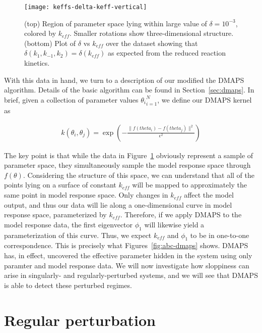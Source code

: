 \begin{figure}[ht!]
  \centering
  \texttt{[image: keffs-delta-keff-vertical]}
  \caption[Quantitative three-dimensional views of level sets of the
  effective parameter in a model of chemical kinetics]{(top) Region of
    parameter space lying within large value of $\delta = 10^{-3}$,
    colored by $k_{eff}$. Smaller rotations show three-dimensional
    structure. (bottom) Plot of $\delta$ vs $k_{eff}$ over the dataset
    showing that $\delta(k_1, k_{-1}, k_2) = \delta(k_{eff})$ as
    expected from the reduced reaction kinetics. \label{fig:abc-keff}
  }
\end{figure}

With this data in hand, we turn to a description of our modified the
DMAPS algorithm. Details of the basic algorithm can be found in
Section~\ref{sec:dmaps}. In brief, given a collection of parameter
values ${\theta_i}_{i=1}^N$, we define our DMAPS kernel as

\begin{align}
  k(\theta_i, \theta_j) = \exp \left(-\frac{\|f(theta_i) -
  f(theta_j)\|^2}{\epsilon^2} \right)
\end{align}

The key point is that while the data in Figure~\ref{fig:abc-keff}
obviously represent a sample of parameter space, they simultaneously
sample the model response space through $f(\theta)$. Considering the
structure of this space, we can understand that all of the points
lying on a surface of constant $k_{eff}$ will be mapped to
approximately the same point in model response space. Only changes in
$k_{eff}$ affect the model output, and thus our data will lie along a
one-dimensional curve in model response space, parameterized by
$k_{eff}$. Therefore, if we apply DMAPS to the model response data,
the first eigenvector $\phi_1$ will likewise yield a parameterization
of this curve. Thus, we expect $k_{eff}$ and $\phi_1$ to be in
one-to-one correspondence. This is precisely what
Figures~\ref{fig:abc-dmaps} shows. DMAPS has, in effect, uncovered the
effective parameter hidden in the system using only paramter and model
response data. We will now investigate how sloppiness can arise in
singularly- and regularly-perturbed systems, and we will see that
DMAPS is able to detect these perturbed regimes.

\section{Regular perturbation}




